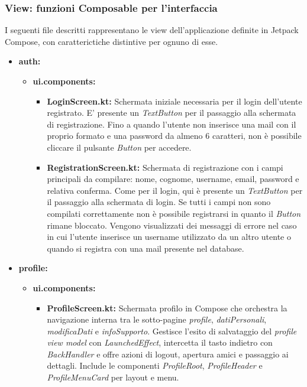 \documentclass{article}
\begin{document}
\subsubsection{View: funzioni Composable per l'interfaccia}
I seguenti file descritti rappresentano le view dell'applicazione definite in Jetpack Compose, con caratterictiche distintive per ognuno di esse.
\begin{itemize}
  \item \textbf{auth:}
  \begin{itemize}
    \item \textbf{ui.components:}
    \begin{itemize}
      \item \textbf{LoginScreen.kt:} Schermata iniziale necessaria per il login dell'utente registrato. E' presente un \textit{TextButton} per il passaggio alla schermata di registrazione. Fino a quando l'utente non inserisce una mail con il proprio formato e una password da almeno 6 caratteri, non è possibile cliccare il pulsante \textit{Button} per accedere.
      \item \textbf{RegistrationScreen.kt:} Schermata di registrazione con i campi principali da compilare: nome, cognome, username, email, password e relativa conferma. Come per il login, qui è presente un \textit{TextButton} per il passaggio alla schermata di login. Se tutti i campi non sono compilati correttamente non è possibile registrarsi in quanto il \textit{Button} rimane bloccato. 
      Vengono visualizzati dei messaggi di errore nel caso in cui l'utente inserisce un username utilizzato da un altro utente o quando si registra con una mail presente nel database.
    \end{itemize}
  \end{itemize}
  \item \textbf{profile:}
  \begin{itemize}
    \item \textbf{ui.components:}
    \begin{itemize}
      \item \textbf{ProfileScreen.kt:}
      Schermata profilo in Compose che orchestra la navigazione interna tra le sotto-pagine \textit{profile}, \textit{datiPersonali}, \textit{modificaDati} e \textit{infoSupporto}. Gestisce l’esito di salvataggio del \textit{profile view model} con \textit{LaunchedEffect}, intercetta il tasto indietro con \textit{BackHandler} e offre azioni di logout, apertura amici e passaggio ai dettagli. Include le componenti \textit{ProfileRoot}, \textit{ProfileHeader} e \textit{ProfileMenuCard} per layout e menu.

\end{itemize}
\end{itemize}
\end{itemize}
\end{document}

